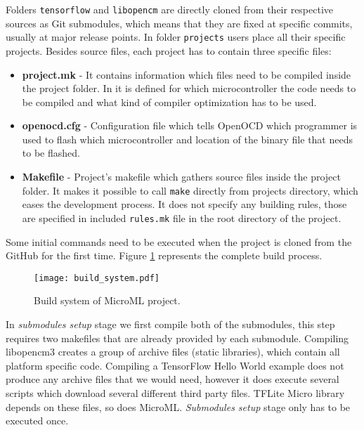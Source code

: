 Folders \verb|tensorflow| and \verb|libopencm| are directly cloned from their respective sources as Git submodules, which means that they are fixed at specific commits, usually at major release points.
In folder \verb|projects| users place all their specific projects.
Besides source files, each project has to contain three specific files:

\begin{itemize}
    \item \textbf{project.mk} - It contains information which files need to be compiled inside the project folder. In it is defined for which microcontroller the code needs to be compiled and what kind of compiler optimization has to be used.
    \item \textbf{openocd.cfg} - Configuration file which tells OpenOCD which programmer is used to flash which microcontroller and location of the binary file that needs to be flashed.
    \item \textbf{Makefile} - Project's makefile which gathers source files inside the project folder. It makes it possible to call \verb|make| directly from projects directory, which eases the development process. It does not specify any building rules, those are specified in included \verb|rules.mk| file in the root directory of the project.
\end{itemize}

Some initial commands need to be executed when the project is cloned from the GitHub for the first time. 
Figure \ref{build_system} represents the complete build process.

\begin{figure}[ht]
        \centering
        \texttt{[image: build\_system.pdf]} 
        \caption{ Build system of MicroML project.} 
        \label{build_system}
\end{figure}

In \textit{submodules setup} stage we first compile both of the submodules, this step requires two makefiles that are already provided by each submodule.
Compiling libopencm3 creates a group of archive files (static libraries), which contain all platform specific code.
Compiling a TensorFlow Hello World example does not produce any archive files that we would need, however it does execute several scripts which download several different third party files.
TFLite Micro library depends on these files, so does MicroML.
\textit{Submodules setup} stage only has to be executed once.

